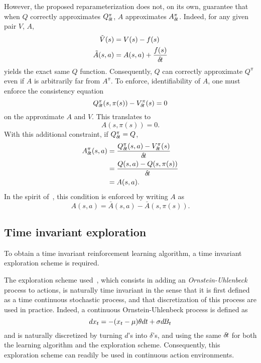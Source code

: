 However, the proposed reparameterization does not, on its own, guarantee that
when $Q$ correctly approximates $Q^\pi_{\delta\hspace{-.1em}t}$, $A$ approximates $A^\pi_{\delta\hspace{-.1em}t}$.
Indeed, for any given pair $V$, $A$,
\begin{align}
	\tilde{V}(s) &= V(s) - f(s)\\
	\tilde{A}(s, a) &= A(s, a) + \frac{f(s)}{{\delta\hspace{-.1em}t}}
\end{align}
yields the exact same $Q$ function. Consequently, $Q$ can correctly approximate
$Q^\pi$ even if $A$ is arbitrarily far from $A^\pi$.
To enforce, identifiability of $A$, one must enforce the consistency equation
\begin{equation}
	Q^\pi_{\delta\hspace{-.1em}t}(s, \pi(s)) - V^\pi_{\delta\hspace{-.1em}t}(s) = 0
\end{equation}
on the approximate $A$ and $V$. This translates to
\begin{equation}
	A(s, \pi(s)) = 0.
\end{equation}
With this additional constraint, if $Q^\pi_{\delta\hspace{-.1em}t} = Q$,
\begin{align}
	A^\pi_{\delta\hspace{-.1em}t}(s, a) &= \frac{Q^\pi_{\delta\hspace{-.1em}t}(s,a) - V^\pi_{\delta\hspace{-.1em}t}(s)}{{\delta\hspace{-.1em}t}}\\
		    &= \frac{Q(s,a) - Q(s, \pi(s))}{{\delta\hspace{-.1em}t}}\\
		    &= A(s, a).
\end{align}
In the spirit of~\cite{dueling_nets}, this condition is enforced by writing $A$ as
\begin{equation}
	A(s, a) = \bar{A}(s, a) - \bar{A}(s, \pi(s)).
\end{equation}

\subsection{Time invariant exploration}
\label{subsec:explo}
To obtain a time invariant reinforcement learning algorithm, a time invariant
exploration scheme is required. 

The exploration scheme used~\cite{ddpg}, which consists in adding an
\emph{Ornstein-Uhlenbeck}~\cite{orn-uhl} process to actions, is naturally time
invariant in the sense that it is first defined as a time continuous stochastic
process, and that discretization of this process are used in practice. Indeed,
a continuous Ornstein-Uhlenbeck process is defined as
\begin{equation}
	dx_t = - (x_t - \mu) \theta dt + \sigma d\hspace{-.1em}B_t
	\label{eq:orn_uhl}
\end{equation}
and is naturally discretized by turning $d$'s into $\delta$'s, and using
the same ${\delta\hspace{-.1em}t}$ for both the learning algorithm and the exploration scheme.
Consequently, this exploration scheme can readily be used in continuous action
environments.

